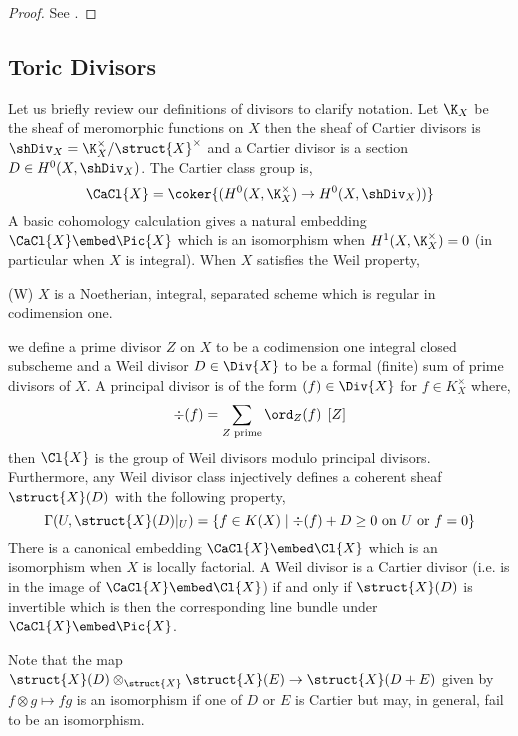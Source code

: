 \begin{proof}
See \cite[Lec. 2, Thm. 2.3]{cox_lectures}.
\end{proof}

\subsection{Toric Divisors}


Let us briefly review our definitions of divisors to clarify notation. Let $\K_X$ be the sheaf of meromorphic functions on $X$ then the sheaf of Cartier divisors is $\shDiv_X = \K_X^\times / \struct{X}^\times$ and a Cartier divisor is a section $D \in H^0(X, \shDiv_X)$. The Cartier class group is,
\[ \CaCl{X} = \coker{(H^0(X, \K_X^\times) \to H^0(X, \shDiv_X))} \] 
A basic cohomology calculation gives a natural embedding $\CaCl{X} \embed \Pic{X}$ which is an isomorphism when $H^1(X, \K_X^\times) = 0$ (in particular when $X$ is integral). When $X$ satisfies the Weil property,
\begin{center}
(W) $X$ is a Noetherian, integral, separated scheme which is regular in codimension one. 
\end{center} 
we define a prime divisor $Z$ on $X$ to be a codimension one integral closed subscheme and a Weil divisor $D \in \Div{X}$ to be a formal (finite) sum of prime divisors of $X$. A principal divisor is of the form $(f) \in \Div{X}$ for $f \in K_X^\times$ where,
\[ \div(f) = \sum_{Z \text{ prime}} \ord_{Z}(f) \: \: [Z] \]
then $\Cl{X}$ is the group of Weil divisors modulo principal divisors. Furthermore, any Weil divisor class injectively defines a coherent sheaf $\struct{X}(D)$ with the following property,
\[ \Gamma(U, \struct{X}(D)|_U) = \{ f \in K(X) \mid \div{(f)} + D \ge 0 \text{ on } U \text{ or } f = 0 \} \] 
There is a canonical embedding $\CaCl{X} \embed \Cl{X}$ which is an isomorphism when $X$ is locally factorial. A Weil divisor is a Cartier divisor (i.e. is in the image of $\CaCl{X} \embed \Cl{X}$) if and only if $\struct{X}(D)$ is invertible which is then the corresponding line bundle under $\CaCl{X} \embed \Pic{X}$.
\begin{rmk}
Note that the map $\struct{X}(D) \otimes_{\struct{X}} \struct{X}(E) \to \struct{X}(D + E)$ given by $f \otimes g \mapsto fg$ is an isomorphism if one of $D$ or $E$ is Cartier but may, in general, fail to be an isomorphism. 
\end{rmk}
\noindent\\
